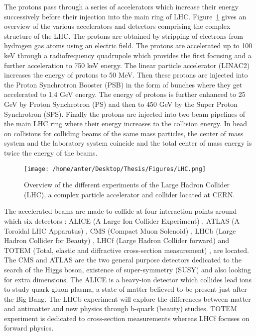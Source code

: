 The protons pass through a series of accelerators which increase their energy successively before their injection into the main ring of LHC. Figure~\ref{fig:LHC} gives an overview of the various accelerators and detectors comprising the complex structure of the LHC. The protons are obtained by stripping of electrons from hydrogen gas atoms using an electric field. The protons are accelerated up to 100 keV through a radiofrequency quadrupole which provides the first focusing and a further acceleration to 750 keV energy. The linear particle accelerator (LINAC2) increases the energy of protons to 50 MeV. Then these protons are injected into the Proton Synchrotron Booster (PSB) in the form of bunches where they get accelerated to 1.4 GeV energy. The energy of protons is further enhanced to 25 GeV by Proton Synchrotron (PS) and then to 450 GeV by the Super Proton Synchrotron (SPS). Finally the protons are injected into two beam pipelines of the main LHC ring where their energy increases to the collision energy. In head on collisions for colliding beams of the same mass particles, the center of mass system and the laboratory system coincide and the total center of mass energy is twice the energy of the beams. 

\begin{figure}[!h]
 \begin{center} 
 \hspace*{-5mm}
 \texttt{[image: /home/anter/Desktop/Thesis/Figures/LHC.png]}\\
 \vspace*{5mm}
 \caption[Overview of the different experiments of the Large Hadron Collider (LHC), a complex particle accelerator and collider located at CERN.]{Overview of the different experiments of the Large Hadron Collider (LHC), a complex particle accelerator and collider located at CERN\footnotemark.}
 \label{fig:LHC}
 \end{center}
\end{figure}

The accelerated beams are made to collide at four interaction points around which six detectors : ALICE (A Large Ion Collider Experiment) \cite{Aamodt:2008zz}, ATLAS (A Toroidal LHC Apparatus) \cite{Aad:2008zzm}, CMS (Compact Muon Solenoid) \cite{Chatrchyan:2008aa,Bayatian:2006nff,Ball:2007zza}, LHCb (Large Hadron Collider for Beauty) \cite{Alves:2008zz}, LHCf (Large Hadron Collider forward)\cite{Adriani:2008zz} and TOTEM (Total, elastic and diffractive cross-section measurement) \cite{Anelli:2008zza}, are located. The CMS and ATLAS are the two general purpose detectors dedicated to the search of the Higgs boson, existence of super-symmetry (SUSY) and also looking for extra dimensions. The ALICE is a heavy-ion detector which collides lead ions to study quark-gluon plasma, a state of matter believed to be present just after the Big Bang. The LHCb experiment will explore the differences between matter and antimatter and new physics through b-quark (beauty) studies. TOTEM experiment is dedicated to cross-section measurements whereas LHCf focuses on forward physics. 

